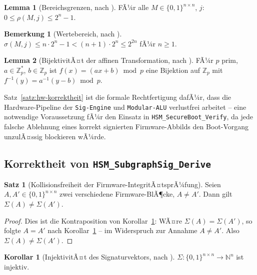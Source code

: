﻿\documentclass[a4paper,12pt]{article}
\theoremstyle{definition}
\newtheorem{satz}{Satz}
\newtheorem{lemma}{Lemma}
\newtheorem{korollar}{Korollar}
\newtheorem{bemerkung}{Bemerkung}
\begin{document}
\begin{lemma}[Bereichsgrenzen, nach \cite{Epp26b}]
	\label{lem:rho-bounds-hw}
	FÃ¼r alle $M \in \{0,1\}^{n\times n}$, $j$: $0 \le \rho(M,j) \le 2^n - 1$.
\end{lemma}

\begin{bemerkung}[Wertebereich, nach \cite{Epp26b}]
	\label{bem:wertebereich-hw}
	$\sigma(M,j) \le n \cdot 2^n - 1 < (n+1)\cdot 2^n \le 2^{2n}$ fÃ¼r $n \ge 1$.
\end{bemerkung}

\begin{lemma}[BijektivitÃ¤t der affinen Transformation, nach \cite{Epp26b}]
	\label{lem:affin-bij-hw}
	FÃ¼r $p$ prim, $a \in \mathbb{Z}_p^*$, $b \in \mathbb{Z}_p$ ist $f(x)=(ax+b)\bmod p$ eine Bijektion auf $\mathbb{Z}_p$ mit $f^{-1}(y)=a^{-1}(y-b)\bmod p$.
\end{lemma}

Satz~\ref{satz:hw-korrektheit} ist die formale Rechtfertigung dafÃ¼r, dass die Hardware-Pipeline der \texttt{Sig-Engine} und \texttt{Modular-ALU} verlustfrei arbeitet -- eine notwendige Voraussetzung fÃ¼r den Einsatz in \texttt{HSM\_SecureBoot\_Verify}, da jede falsche Ablehnung eines korrekt signierten Firmware-Abbilds den Boot-Vorgang unzulÃ¤ssig blockieren wÃ¼rde.

\subsection{Korrektheit von \texttt{HSM\_SubgraphSig\_Derive}}

\begin{satz}[Kollisionsfreiheit der Firmware-IntegritÃ¤tsprÃ¼fung]
	\label{satz:kollisionsfrei}
	Seien $A, A' \in \{0,1\}^{n\times n}$ zwei verschiedene Firmware-BlÃ¶cke, $A \ne A'$. Dann gilt $\Sigma(A) \ne \Sigma(A')$.
\end{satz}

\begin{proof}
	Dies ist die Kontraposition von Korollar~\ref{kor:sigma-inj-hw}: WÃ¤re $\Sigma(A) = \Sigma(A')$, so folgte $A = A'$ nach Korollar~\ref{kor:sigma-inj-hw} -- im Widerspruch zur Annahme $A \ne A'$. Also $\Sigma(A) \ne \Sigma(A')$. \qedhere
\end{proof}

\begin{korollar}[InjektivitÃ¤t des Signaturvektors, nach \cite{Epp26a,Epp26b}]
	\label{kor:sigma-inj-hw}
	$\Sigma: \{0,1\}^{n\times n} \to \mathbb{N}^n$ ist injektiv.
\end{korollar}
\end{document}
